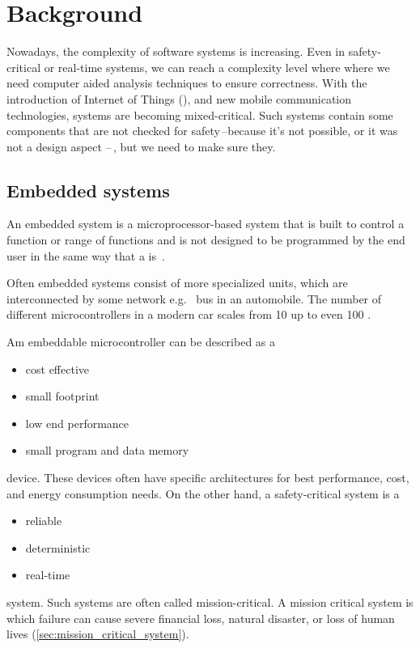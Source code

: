 
\chapter{Background}
\label{ch:background}

Nowadays, the complexity of software systems is increasing. Even in safety-critical or real-time systems, we can reach a complexity level where where we need computer aided analysis techniques to ensure correctness. With the introduction of Internet of Things (\iot), and new mobile communication technologies, systems are becoming mixed-critical. Such systems contain some components that are not checked for safety\,--because it's not possible, or it was not a design aspect --\,, but we need to make sure they.

\section{Embedded systems}

An embedded system is a microprocessor-based system that is built to control a function or range of functions and is not designed to be programmed by the end user in the same way that a  is~\cite{heath2002embedded}.

Often embedded systems consist of more specialized units, which are interconnected by some network e.g.\  bus in an automobile. The number of different microcontrollers in a modern car scales from 10 up to even 100 \citep{VEHICLE_DYN}.

Am embeddable microcontroller can be described as a
\begin{itemize}
	\item cost effective
	\item small footprint
	\item low end performance
	\item small program and data memory
\end{itemize}
device. These devices often have specific architectures for best performance, cost, and energy consumption needs.
\needspace{5em}
\noindent On the other hand, a safety-critical system is a
\begin{itemize}
	\item reliable
	\item deterministic
	\item real-time
\end{itemize}
system. Such systems are often called mission-critical. A mission critical system is which failure can cause severe financial loss, natural disaster, or loss of human lives (\cref{sec:mission_critical_system}).

